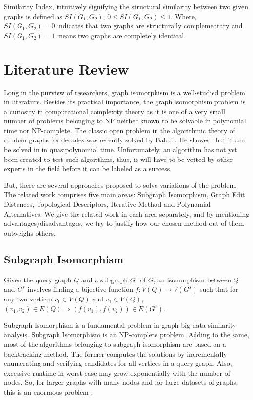 Similarity Index, intuitively signifying the structural similarity between two given graphs is defined as $SI (G_{1}, G_{2})$,  $ 0 \leq SI(G_{1}, G_{2}) \leq 1 $. Where,  $SI (G_{1}, G_{2}) = 0 $ indicates that two graphs are structurally complementary and  $SI (G_{1}, G_{2}) = 1$ means two graphs are completely identical.



\section{Literature Review}
Long in the purview of researchers, graph isomorphism is a well-studied problem in literature. Besides its practical importance, the graph isomorphism problem is a curiosity in computational complexity theory as it is one of a very small number of problems belonging to NP neither known to be solvable in polynomial time nor NP-complete. The classic open problem in the algorithmic theory of random graphs for decades was recently solved by Babai \citep{Babai2016}. He showed that it can be solved in in quasipolynomial time. Unfortunately, an algorithm has not yet been created to test such algorithms, thus, it will have to be vetted by other experts in the field before it can be labeled as a success. 

But, there are several approaches proposed to solve variations of the problem. The related work comprises five main areas: Subgraph Isomorphism, Graph Edit Distances, Topological Descriptors, Iterative Method and Polynomial Alternatives. We give the related work in each area separately, and by mentioning advantages/disadvantages, we try to justify how our chosen method out of them outweighs others.

\subsection{Subgraph Isomorphism}

Given the query graph $Q$ and a subgraph $G^{s}$ of $G$, an isomorphism between $Q$ and $G^{s}$ involves finding a bijective function  $f \colon V (Q) \rightarrow V (G^{s})$ such that for any two vertices $v_{1} \in V (Q)$ and $v_{1} \in V (Q)$, $(v_{1} , v_{2}) \in E(Q) \Rightarrow (f (v_{1} ), f (v_{2} )) \in E(G^{s})$.

Subgraph Isomorphism is a fundamental problem in graph big data similarity analysis. Subgraph Isomorphism is an NP-complete problem. Adding to the same, most of the algorithms belonging to subgraph isomorphism are based on a backtracking method. The former computes the solutions by incrementally enumerating and verifying candidates for all vertices in a query graph. Also, excessive runtime in worst case may grow exponentially with the number of nodes. So, for larger graphs with many nodes and for large datasets of graphs, this is an enormous problem \citep{Lee2015}.

